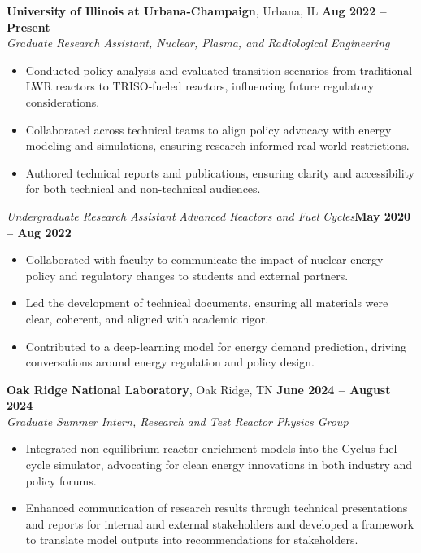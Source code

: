 \documentclass[margin,line]{resume}
\begin{document}
\begin{resume}
    \textbf{University of Illinois at Urbana-Champaign}, Urbana, IL \hfill \textbf{Aug 2022 -- Present} \\
    \textsl{Graduate Research Assistant, Nuclear, Plasma, and Radiological Engineering} \\
    \begin{itemize}
        \item Conducted policy analysis and evaluated transition scenarios from traditional LWR reactors to TRISO-fueled reactors, influencing future regulatory considerations.
        \item Collaborated across technical teams to align policy advocacy with energy modeling and simulations, ensuring research informed real-world restrictions.
        \item Authored technical reports and publications, ensuring clarity and accessibility for both technical and non-technical audiences.
    \end{itemize}

    \textsl{Undergraduate Research Assistant} \textsl{Advanced Reactors and Fuel Cycles}\hfill \textbf{May 2020 -- Aug 2022}\\
    \begin{itemize}
        \item Collaborated with faculty to communicate the impact of nuclear energy policy and regulatory changes to students and external partners.
        \item Led the development of technical documents, ensuring all materials were clear, coherent, and aligned with academic rigor.
        \item Contributed to a deep-learning model for energy demand prediction, driving conversations around energy regulation and policy design.
    \end{itemize}

    \textbf{Oak Ridge National Laboratory}, Oak Ridge, TN \hfill \textbf{June 2024 -- August 2024} \\
    \textsl{Graduate Summer Intern, Research and Test Reactor Physics Group} \\
    \begin{itemize}
        \item Integrated non-equilibrium reactor enrichment models into the Cyclus fuel cycle simulator, advocating for clean energy innovations in both industry and policy forums.
        \item Enhanced communication of research results through technical presentations and reports for internal and external stakeholders and developed a framework to translate model outputs into recommendations for stakeholders.
    \end{itemize}


\end{resume}
\end{document}
